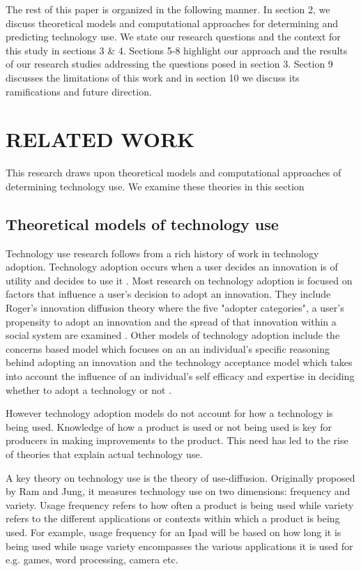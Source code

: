\documentclass{acm_proc_article-sp}
\begin{document}
The rest of this paper is organized in the following manner. In section 2, we discuss theoretical models and computational approaches for determining and predicting technology use. We state our research questions and the context for this study in sections 3 \& 4. Sections 5-8 highlight our approach and the results of our research studies addressing the questions posed in section 3. Section 9 discusses the limitations of this work and in section 10 we discuss its ramifications and future direction.
 
\section{RELATED WORK} \label{section:relatedwork}
This research draws upon theoretical models and computational approaches of determining technology use. We examine these theories in this section
\subsection{Theoretical models of technology use}
Technology use research follows from a rich history of work in technology adoption. Technology adoption occurs when a user decides an innovation is of utility and decides to use it \cite{straub2009understanding}. Most research on technology adoption is focused on factors that influence a user's decision to adopt an innovation. They include Roger's innovation diffusion theory where the five "adopter categories", a user's propensity to adopt an innovation and the spread of that innovation within a social system are examined \cite{rogers2010diffusion}. Other models of technology adoption include the concerns based model which focuses on an an individual's specific reasoning behind adopting an innovation \cite{fuller1975concerns, hall1979concerns} and the technology acceptance model \cite{legris2003people} which takes into account the influence of an individual's self efficacy and expertise in deciding whether to adopt a technology or not \cite{legris2003people}.

However technology adoption models do not account for how a technology is being used. Knowledge of how a product is used or not being used is key for producers in making improvements to the product. This need has led to the rise of theories that explain actual technology use.

A key theory on technology use is the theory of use-diffusion. Originally proposed by Ram and Jung\cite{ram1990conceptualization}, it measures technology use on two dimensions: frequency and variety. Usage frequency refers to how often a product is being used while variety refers to the different applications or contexts within which a product is being used. For example, usage frequency for an Ipad will be based on how long it is being used while usage variety encompasses the various applications it is used for e.g. games, word processing, camera etc.
\end{document}
